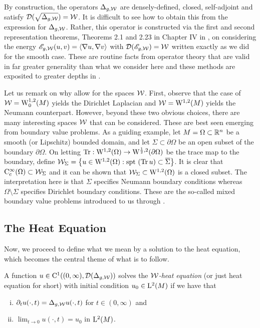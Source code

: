 \documentclass[a4paper, 12pt]{amsart}
\begin{document}
By construction, the  operators $\Delta_{g,\cW}$ 
are densely-defined, closed, self-adjoint and satisfy 
$\dom(\sqrt{\Delta_{g,\cW}}) = \cW$.
It is difficult to see how to obtain this from the expression for $\Delta_{g,\cW}$.
Rather, this operator is constructed via the first and second representation 
theorems, Theorems 2.1 and 2.23 in Chapter IV in \cite{Kato}, on considering the   
energy $\sE_{g,\cW}(u,v) = \inprod{\nabla u, \nabla v}$ 
with $\dom(\sE_{g,\cW}) = \cW$ written exactly as we did for the smooth case.
These are routine facts from operator theory that are valid in far greater generality 
than what we consider here and these methods are exposited to 
greater depths in \cite{Yosida, Kato}.
 
Let us remark on why allow for the spaces \(\cW\). First, observe that the case of $\cW = \SobH[0]{1}(M)$
yields the Dirichlet Laplacian
and $\cW = \SobH{1}(M)$ yields the Neumann counterpart.
However, beyond these two obvious choices, 
there are many interesting spaces $\cW$ that
can be considered. These are best
seen emerging from boundary value problems.
As a guiding example, let $M = \Omega \subset \R^n$
be a smooth (or Lipschitz) bounded domain, and let $\Sigma \subset \partial \Omega$
be an open subset of the boundary $\partial \Omega$.
On letting $\Tr: \SobH{1}(\Omega) \to \SobH{\frac{1}{2}}(\partial \Omega)$
be the trace map to the boundary, define 
$\cW_{\Sigma} = \set{u \in \SobH{1}(\Omega): \spt (\Tr u) \subset \close{\Sigma}}$. 
It is clear that $\Ck[c]{\infty}(\Omega) \subset \cW_{\Sigma}$ and
it can be shown that $\cW_{\Sigma} \subset \SobH{1}(\Omega)$
is a closed subset. 
The interpretation here is that $\Sigma$ specifies Neumann boundary conditions whereas $\Omega \setminus \Sigma$
specifies Dirichlet boundary conditions. 
These are the so-called mixed boundary value problems 
introduced to us through \cite{AKM2}.

\subsection{The Heat Equation}

Now, we proceed to define what we mean by a solution to the heat
equation, which becomes the central theme of what is to follow.

\begin{defn}
A function \(u \in \Ck{1}((0,\infty),  \dom(\Delta_{g,\cW}))\) solves the \emph{\(\cW\)-heat equation} (or just heat equation for short) with initial condition $u_0 \in \Lp{2}(M)$ if we have that
\begin{enumerate}[(i)]
\item  $\partial_t u (\cdot, t) = \Delta_{g,\cW} u(\cdot, t)$ for $t \in (0, \infty)$ and 
\item $\lim_{t \to 0} u(\cdot, t) = u_0$ in $\Lp{2}(M)$.
\end{enumerate}
\end{defn}
\end{document}
